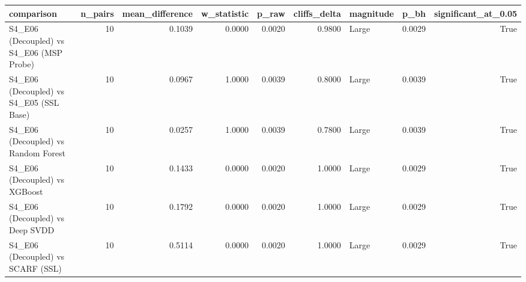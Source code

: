 \begin{tabular}{lrrrrrlrr}
\toprule
comparison & n_pairs & mean_difference & w_statistic & p_raw & cliffs_delta & magnitude & p_bh & significant_at_0.05 \\
\midrule
S4_E06 (Decoupled) vs S4_E06 (MSP Probe) & 10 & 0.1039 & 0.0000 & 0.0020 & 0.9800 & Large & 0.0029 & True \\
S4_E06 (Decoupled) vs S4_E05 (SSL Base) & 10 & 0.0967 & 1.0000 & 0.0039 & 0.8000 & Large & 0.0039 & True \\
S4_E06 (Decoupled) vs Random Forest & 10 & 0.0257 & 1.0000 & 0.0039 & 0.7800 & Large & 0.0039 & True \\
S4_E06 (Decoupled) vs XGBoost & 10 & 0.1433 & 0.0000 & 0.0020 & 1.0000 & Large & 0.0029 & True \\
S4_E06 (Decoupled) vs Deep SVDD & 10 & 0.1792 & 0.0000 & 0.0020 & 1.0000 & Large & 0.0029 & True \\
S4_E06 (Decoupled) vs SCARF (SSL) & 10 & 0.5114 & 0.0000 & 0.0020 & 1.0000 & Large & 0.0029 & True \\
\bottomrule
\end{tabular}
